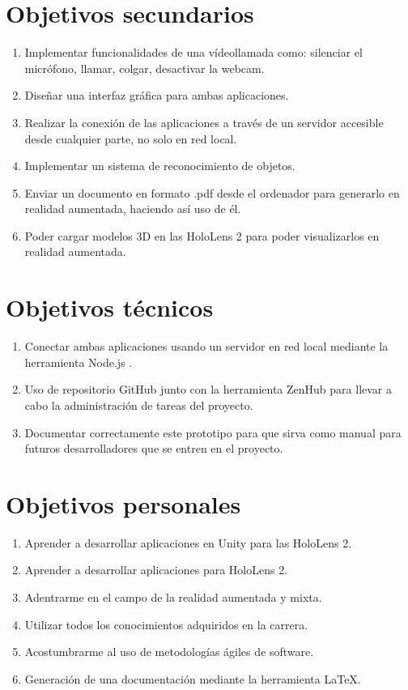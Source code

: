 \section{Objetivos secundarios}
\begin{enumerate}
	\item Implementar funcionalidades de una vídeollamada como: silenciar el micrófono, llamar, colgar, desactivar la webcam.
	\item Diseñar una interfaz gráfica para ambas aplicaciones.
	\item Realizar la conexión de las aplicaciones a través de un servidor accesible desde cualquier parte, no solo en red local.
	\item Implementar un sistema de reconocimiento de objetos.
	\item Enviar un documento en formato .pdf desde el ordenador para generarlo en realidad aumentada, haciendo así uso de él.
	\item Poder cargar modelos 3D en las HoloLens 2 para poder visualizarlos en realidad aumentada.
\end{enumerate}
\section{Objetivos técnicos}
\begin{enumerate}
	\item Conectar ambas aplicaciones usando un servidor en red local mediante la herramienta Node.js \cite{node:js}.
	\item Uso de repositorio GitHub \cite{git:github} junto con la herramienta ZenHub \cite{git:zenhub} para llevar a cabo la administración de tareas del proyecto.
	\item Documentar correctamente este prototipo para que sirva como manual para futuros desarrolladores que se entren en el proyecto.
\end{enumerate}
\section{Objetivos personales}
\begin{enumerate}

	\item Aprender a desarrollar aplicaciones en Unity \cite{unity:unity} para las HoloLens 2.
	\item Aprender a desarrollar aplicaciones para HoloLens 2.
	\item Adentrarme en el campo de la realidad aumentada y mixta.
	\item Utilizar todos los conocimientos adquiridos en la carrera.
	\item Acostumbrarme al uso de metodologías ágiles de software.
	\item Generación de una documentación mediante la herramienta \LaTeX.
\end{enumerate}